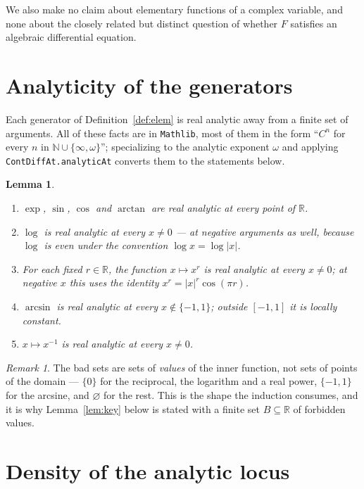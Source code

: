 \documentclass[11pt,oneside]{article}
\newtheorem{lemma}[theorem]{Lemma}
\theoremstyle{definition}
\theoremstyle{remark}
\newtheorem{remark}[theorem]{Remark}
\newcommand{\R}{\mathbb R}
\newcommand{\N}{\mathbb N}
\begin{document}
We also make no claim about elementary functions of a complex variable, and
none about the closely related but distinct question of whether $F$ satisfies
an algebraic differential equation.

\section{Analyticity of the generators}

Each generator of Definition~\ref{def:elem} is real analytic away from a finite set of
arguments.  All of these facts are in \texttt{Mathlib}, most of them in the
form ``$C^n$ for every $n$ in $\N\cup\{\infty,\omega\}$''; specializing to the
analytic exponent $\omega$ and applying \texttt{ContDiffAt.analyticAt}
converts them to the statements below.

\begin{lemma}\label{lem:generators}
\leavevmode
\begin{enumerate}
\item $\exp$, $\sin$, $\cos$ and $\arctan$ are real analytic at every point
      of $\R$.
\item $\log$ is real analytic at every $x\ne 0$ --- at negative arguments as
      well, because $\log$ is even under the convention $\log x=\log|x|$.
\item For each fixed $r\in\R$, the function $x\mapsto x^{r}$ is real analytic
      at every $x\ne 0$; at negative $x$ this uses the identity
      $x^{r}=|x|^{r}\cos(\pi r)$.
\item $\arcsin$ is real analytic at every $x\notin\{-1,1\}$; outside
      $[-1,1]$ it is locally constant.
\item $x\mapsto x^{-1}$ is real analytic at every $x\ne 0$.
\end{enumerate}
\end{lemma}

\begin{remark}
The bad sets are sets of \emph{values} of the inner function, not sets of
points of the domain --- $\{0\}$ for the reciprocal, the logarithm and a real
power, $\{-1,1\}$ for the arcsine, and $\varnothing$ for the rest.  This is
the shape the induction consumes, and it is why Lemma~\ref{lem:key} below is stated
with a finite set $B\subseteq\R$ of forbidden values.
\end{remark}

\section{Density of the analytic locus}\label{sec:density}
\end{document}
